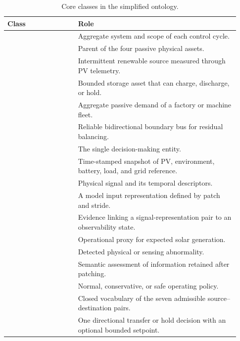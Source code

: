 \begin{table}[H]
\centering
\small
\begin{tabular}{@{}L{0.29\linewidth}L{0.64\linewidth}@{}}
\toprule
\textbf{Class} & \textbf{Role} \\
\midrule
{} & Aggregate system and scope of each control cycle. \\
 & Parent of the four passive physical assets. \\
 & Intermittent renewable source measured through PV telemetry. \\
 & Bounded storage asset that can charge, discharge, or hold. \\
 & Aggregate passive demand of a factory or machine fleet. \\
 & Reliable bidirectional boundary bus for residual balancing. \\
 & The single decision-making entity. \\
 & Time-stamped snapshot of PV, environment, battery, load, and grid reference. \\
 & Physical signal and its temporal descriptors. \\
 & A model input representation defined by patch and stride. \\
 & Evidence linking a signal-representation pair to an observability state. \\
 & Operational proxy for expected solar generation. \\
 & Detected physical or sensing abnormality. \\
 & Semantic assessment of information retained after patching. \\
 & Normal, conservative, or safe operating policy. \\
 & Closed vocabulary of the seven admissible source--destination pairs. \\
 & One directional transfer or hold decision with an optional bounded setpoint. \\
\bottomrule
\end{tabular}
\caption{Core classes in the simplified ontology.}
\label{tab:classes}
\end{table}
